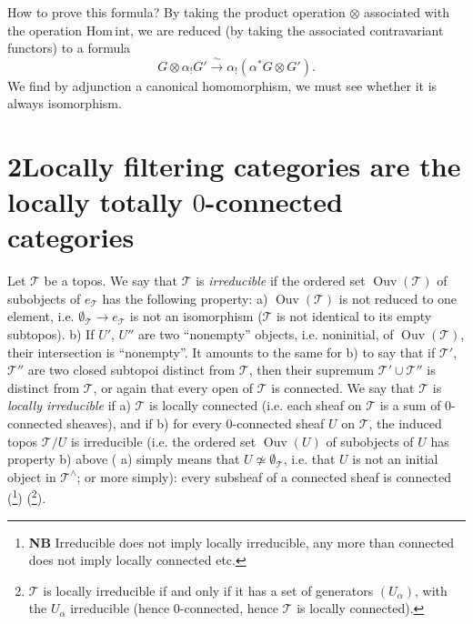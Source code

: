 How to prove this formula? By taking the product operation $\otimes$ associated with the operation Hom\,int, we are reduced (by taking the associated contravariant functors) to a formula
\[ G \otimes \alpha_!G' \xrightarrow{\ \sim\ } \alpha_!(\alpha^*G \otimes G'). \]
We find by adjunction a canonical homomorphism, we must see whether it is always isomorphism.


\section*{2\quad Locally filtering categories are the locally totally $0$-connected categories}

Let $\mathcal{T}$ be a topos. We say that $\mathcal{T}$ is \textit{irreducible} if the ordered set $\operatorname{Ouv}(\mathcal{T})$ of subobjects of $e_{\mathcal{T}}$ has the following property: a) $\operatorname{Ouv}(\mathcal{T})$ is not reduced to one element, i.e. $\emptyset_{\mathcal{T}} \longrightarrow e_{\mathcal{T}}$ is not an isomorphism ($\mathcal{T}$ is not identical to its empty subtopos). b) If $U'$, $U''$ are two ``nonempty'' objects, i.e. noninitial, of $\operatorname{Ouv}(\mathcal{T})$, their intersection is ``nonempty''. It amounts to the same for b) to say that if $\mathcal{T}'$, $\mathcal{T}''$ are two closed subtopoi distinct from $\mathcal{T}$, then their supremum $\mathcal{T}' \cup \mathcal{T}''$ is distinct from $\mathcal{T}$, or again that every open of $\mathcal{T}$ is connected. We say that $\mathcal{T}$ is \textit{locally irreducible} if a) $\mathcal{T}$ is locally connected (i.e. each sheaf on $\mathcal{T}$ is a sum of 0-connected sheaves), and if b) for every 0-connected sheaf $U$ on $\mathcal{T}$, the induced topos $\mathcal{T}/U$ is irreducible (i.e. the ordered set $\operatorname{Ouv}(U)$ of subobjects of $U$ has property b) above ( a) simply means that $U \not\simeq \emptyset_{\mathcal{T}}$, i.e. that $U$ is not an initial object in $\mathcal{T}^\wedge$; or more simply): every subsheaf of a connected sheaf is connected (\footnote[5]{\textbf{NB} Irreducible does not imply locally irreducible, any more than connected does not imply locally connected etc.}) (\footnote[6]{$\mathcal{T}$ is locally irreducible if and only if it has a set of generators $(U_\alpha)$, with the $U_\alpha$ irreducible (hence 0-connected, hence $\mathcal{T}$ is locally connected).}).

